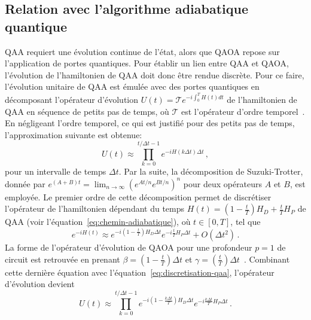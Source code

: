 
\subsection{Relation avec l'algorithme adiabatique quantique}
\label{subsec:discretisation-qaoa}

QAA requiert une évolution continue de l'état, alors que QAOA repose sur l'application de portes quantiques. Pour établir un lien entre QAA et QAOA, l'évolution de l'hamiltonien de QAA doit donc être rendue discrète. Pour ce faire, l'évolution unitaire de QAA est émulée avec des portes quantiques en décomposant l'opérateur d'évolution $U(t) = \mathcal{T} e^{-i \int_{0}^{T} H(t) dt}$ de l'hamiltonien de QAA en séquence de petits pas de temps, où $\mathcal{T}$ est l'opérateur d'ordre temporel~\cite{blekosReviewQuantumApproximate2024}. En négligeant l'ordre temporel, ce qui est justifié pour des petits pas de temps, l'approximation suivante est obtenue: 
\begin{equation}
    \label{eq:discretisation-qaa}
    U(t) \approx \prod_{k=0}^{t / \Delta t -1} e^{-i H(k \Delta t) \Delta t} \,,
 \end{equation}
pour un intervalle de temps $\Delta t$. Par la suite, la décomposition de Suzuki-Trotter, donnée par $e^{(A+B)t} = \lim_{n \to \infty} (e^{At / n} e^{Bt / n})^{n}$ pour deux opérateurs $A$ et $B$, est employée. Le premier ordre de cette décomposition permet de discrétiser l'opérateur de l'hamiltonien dépendant du temps $H(t)=(1-\frac{t}{T})H_{D} + \frac{t}{T}H_{P}$ de QAA (voir l'équation~\ref{eq:chemin-adiabatique}), où $t \in [0, T]$, tel que
\begin{equation}
    e^{-i H(t) } \approx e^{-i (1 - \frac{t}{T}) H_D \Delta t} e^{-i \frac{t}{T} H_P \Delta t} + O(\Delta t^2) \,.
\end{equation}
La forme de l'opérateur d'évolution de QAOA pour une profondeur $p=1$ de circuit est retrouvée en prenant $\beta = (1 - \frac{t}{T}) \Delta t$ et $\gamma = (\frac{t}{T}) \Delta t$~\cite{sackQuantumAnnealingInitialization2021}. Combinant cette dernière équation avec l'équation~\ref{eq:discretisation-qaa}, l'opérateur d'évolution devient
\begin{equation}
    U(t) \approx \prod_{k=0}^{t / \Delta t -1} e^{-i (1 - \frac{k \Delta t}{T}) H_{D} \Delta t} e^{- i \frac{k \Delta t}{T} H_{P} \Delta t} \,.
 \end{equation}

